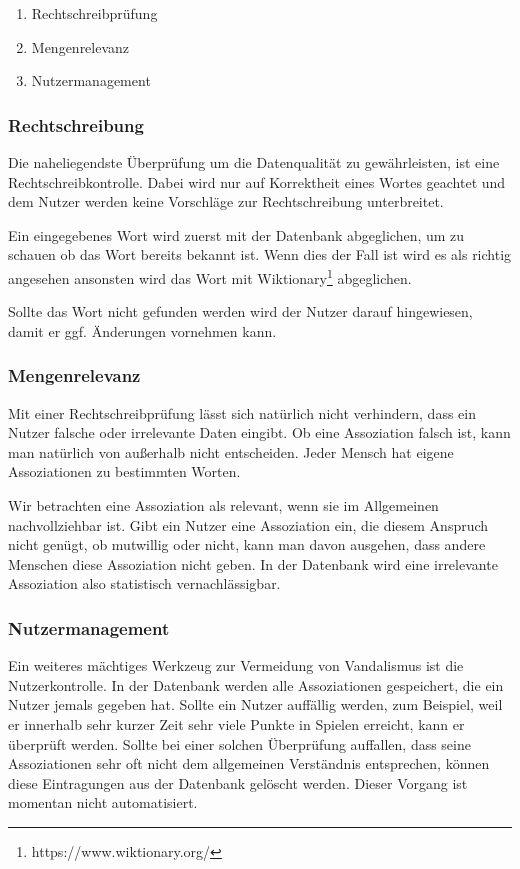 \begin{enumerate}
	\item Rechtschreibprüfung
	\item Mengenrelevanz
	\item Nutzermanagement
\end{enumerate}

\subsubsection{Rechtschreibung}
Die naheliegendste Überprüfung um die Datenqualität zu gewährleisten, ist eine
Rechtschreibkontrolle. Dabei wird nur auf Korrektheit eines Wortes geachtet und dem Nutzer werden keine Vorschläge zur Rechtschreibung unterbreitet.

Ein eingegebenes Wort wird zuerst mit der Datenbank abgeglichen, um zu schauen ob das Wort bereits bekannt ist. Wenn dies der Fall ist wird es als richtig angesehen ansonsten wird das Wort mit Wiktionary\footnote{https://www.wiktionary.org/} abgeglichen.

Sollte das Wort nicht gefunden werden wird der Nutzer darauf hingewiesen, damit er ggf. Änderungen vornehmen kann.

\subsubsection{Mengenrelevanz}
Mit einer Rechtschreibprüfung lässt sich natürlich nicht verhindern, dass ein
Nutzer falsche oder irrelevante Daten eingibt. Ob eine Assoziation falsch ist,
kann man natürlich von außerhalb nicht entscheiden. Jeder Mensch hat eigene
Assoziationen zu bestimmten Worten.

Wir betrachten eine Assoziation als relevant, wenn sie im Allgemeinen
nachvollziehbar ist. Gibt ein Nutzer eine Assoziation ein, die diesem
Anspruch nicht genügt, ob mutwillig oder nicht, kann man davon ausgehen, dass
andere Menschen diese Assoziation nicht geben. In der Datenbank wird eine
irrelevante Assoziation also statistisch vernachlässigbar.

\subsubsection{Nutzermanagement}
Ein weiteres mächtiges Werkzeug zur Vermeidung von Vandalismus ist die
Nutzerkontrolle. In der Datenbank werden alle Assoziationen gespeichert, die
ein Nutzer jemals gegeben hat. Sollte ein Nutzer auffällig werden, zum
Beispiel, weil er innerhalb sehr kurzer Zeit sehr viele Punkte in Spielen
erreicht, kann er überprüft werden. Sollte bei einer solchen Überprüfung
auffallen, dass seine Assoziationen sehr oft nicht dem allgemeinen Verständnis
entsprechen, können diese Eintragungen aus der Datenbank gelöscht werden.
Dieser Vorgang ist momentan nicht automatisiert.

